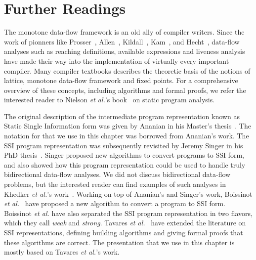 {\section{Further Readings}

The monotone data-flow framework is an old ally of compiler writers.
Since the work of pionners like Prosser~\cite{Prosser59}, Allen~\cite{Allen70,Allen76}, Kildall~\cite{Kildall73}, Kam~\cite{Kam77}, and Hecht~\cite{Hecht77}, data-flow analyses such as reaching definitions, available expressions and liveness analysis have made their way into the implementation of virtually every important compiler.
Many compiler textbooks describes the theoretic basis of the notions of lattice, monotone data-flow framework and fixed points.
For a comprehensive overview of these concepts, including algorithms and formal proofs, we refer the interested reader to Nielson {\em et al.}'s book~\cite{Nielson05} on static program analysis.

The original description of the intermediate program representation known as Static Single Information form was given by Ananian in his Master's thesis~\cite{Ananian99}.
The notation for \sigmafuns that we use in this chapter was borrowed from Ananian's work.
The SSI program representation was subsequently revisited by Jeremy Singer in his PhD thesis~\cite{Singer06}.
Singer proposed new algorithms to convert programs to SSI form, and also showed how this program representation could be used to handle truly bidirectional data-flow analyses.
We did not discuss bidirectional data-flow problems, but the interested reader can find examples of such analyses in Khedker {\em et al.}'s work~\cite{Khedker99}.
Working on top of Ananian's and Singer's work, Boissinot {\em et al.}~\cite{BoissinotBDR12} have proposed a new algorithm to convert a program to SSI form.
Boissinot {\em et al.} have also separated the SSI program representation in two flavors, which they call {\em weak} and {\em strong}.
Tavares {\em et al.}~\cite{Tavares11b} have extended the literature on SSI representations, defining building algorithms and giving formal proofs that these algorithms are correct.
The presentation that we use in this chapter is mostly based on Tavares {\em et
al.}'s work.

}

